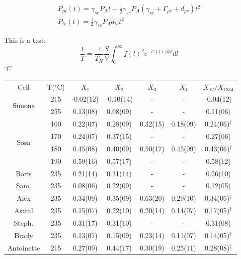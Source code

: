 \documentclass[pdftex,letterpaper,12pt]{report}
\begin{document}
	
\begin{subequations}\label{InitialSpinup}
	\begin{gather}
	P_{pc}(t)=\gamma_{se}P_{A}t-\frac{1}{2}\gamma_{se}P_{A}(\gamma_{se}+\Gamma_{pc}+d_{pc})t^{2}\\
	P_{tc}(t)=\frac{1}{2}\gamma_{se}P_{A}d_{tc}t^{2}
	\end{gather}
\end{subequations}

This is a test:
\begin{equation}
\frac{1}{T}=\frac{1}{T_K}\frac{S}{V}\int_{0}^{\infty} f\left(l\right)^2 e^{-U\left(l\right)/kT}dl
\end{equation}
$^{\circ}C$

\begin{table}\scriptsize
	\captionsetup{font=scriptsize}
	\begin{center}
		\def\arraystretch{0.75}
		\setlength\tabcolsep{1pt}
		\begin{tabular}{|c|c|cccc|c|}
			\hline
			Cell & T($^\circ$C) & $X_1$ & $X_2$ & $X_3$ & $X_4$ & $X_{12}/X_{1234}$\\ 
			\multirow{2}{*}{Simone} & 215 & -0.02(12) & -0.10(14) & - & - & -0.04(12) \\
			& 255 & 0.13(08) & 0.08(09) & - & - & 0.11(06) \\
			\hline
			\multirow{4}{*}{Sosa} & 160 & 0.22(07) & 0.28(09) & 0.32(15) & 0.18(09) & 0.24(06)$^\dagger$ \\
			& 170 & 0.24(07) & 0.37(15) & - & - & 0.27(06)\\
			& 180 & 0.45(08) & 0.40(09) & 0.50(17) & 0.45(09) & 0.43(06)$^\dagger$ \\
			& 190 & 0.59(16) & 0.57(17) & - & - & 0.58(12) \\
			\hline
			\hline
			Boris & 235 & 0.21(14) & 0.31(14) & - & - & 0.26(10)\\
			\hline
			Sam. & 235 & 0.08(06) & 0.22(09) & - & - & 0.12(05) \\
			\hline
			Alex & 235 & 0.34(09) & 0.35(09) & 0.63(20) & 0.29(10) & 0.34(06)$^\dagger$\\
			\hline
			Astral & 235 & 0.15(07) & 0.22(10) & 0.20(14) & 0.14(07) & 0.17(05)$^\dagger$\\
			\hline
			Steph. & 235 & 0.31(17) & 0.31(10) & - & - & 0.31(08)\\
			\hline
			Brady & 235 & 0.13(07) & 0.15(09) & 0.23(14) & 0.11(07) & 0.14(05)$^\dagger$\\
			\hline
			\multirow{3}{*}{Antoinette} & 215 & 0.27(09) & 0.44(17) & 0.30(19) & 0.25(11) & 0.28(08)$^\dagger$\\

\end{tabular}
\end{center}
\end{table}
\end{document}
